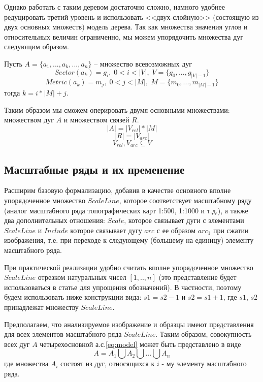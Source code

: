 Однако работать с таким деревом достаточно сложно, намного удобнее редуцировать третий уровень и использовать <<двух-слойную>> (состоящую из двух основных множеств) модель дерева. Так как множества значения углов и относительных величин ограниченно, мы можем упорядочить множества дуг следующим образом.

Пусть $A = \{a_1, ..., a_k, ..., a_n\}$ -- множество всевозможных дуг
$$Sector(a_k) = g_i,\; 0 < i < |V|,\;V = \{g_0, ..., g_{|V|-1}\}$$
$$Metric(a_k) = m_j,\; 0 < j < |M|,\;M = \{m_0, ..., m_{|M|-1}\}$$
тогда $k = i*|M| + j$.

Таким образом мы сможем оперировать двумя основными множествами: множеством дуг $A$ и множеством связей $R$.
$$|A| = |V_{rel}|*|M|$$
$$|R| = |V_{arc}|$$
$$V_{rel}, V_{arc} \subseteq V$$


\subsection{Масштабные ряды и их пременение}
Расширим базовую формализацию, добавив в качестве основного вполне упорядоченное множество $ScaleLine$, которое соответствует масштабному ряду (аналог масштабного ряда топографических карт 1:500,  1:1000 и т.д.), а также два дополнительных отношения: $Scale$,  которое связывает дуги с элементами $ScaleLine$ и $Include$ которое связывает дугу $arc$ с ее образом $arc_1$ при сжатии изображения, т.е. при переходе к следующему (большему на единицу) элементу масштабного ряда.

При практической реализации удобно считать  вполне упорядоченное множество $ScaleLine$ отрезком натуральных чисел $[1,.., n]$ (это представление будет использоваться в статье для упрощения обозначений). В частности, поэтому будем использовать ниже конструкции вида: $s1  = s2 - 1$ и $s2  = s1 + 1$, где $s1$, $s2$  принадлежат  множеству $ScaleLine$.

Предполагаем,  что анализируемое изображение и образцы имеют представления для всех элементов масштабного ряда $ScaleLine$. Таким образом, совокупность всех дуг $A$ четырехосновной а.с.\ref{eq:model} может быть представлено в виде
\begin{equation}
A = A_1 \bigcup A_2 \bigcup ... \bigcup A_n
\label{eq:components_set}
\end{equation}
где  множества $A_i$ состоят из дуг, относящихся к $i$ - му элементу масштабного ряда. 

